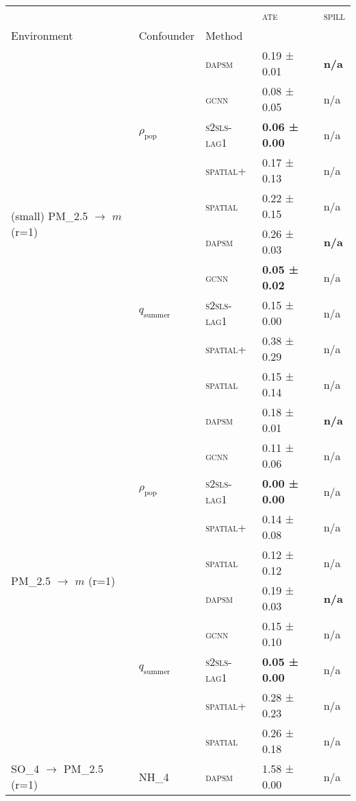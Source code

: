 \documentclass{article}
\begin{document}
\scriptsize
\begin{table}[!tbp]
\centering
\begin{tabular}{lllll}
\toprule
 &  &  & \textsc{ate} & \textsc{spill} \\
Environment & Confounder & Method &  &  \\
\midrule
\multirow[t]{10}{*}{(small) PM_{2.5} $\to$ $m$ (r=1)} & \multirow[t]{5}{*}{$\rho_{\text{pop}}$} & \textsc{dapsm} & 0.19 ± {\small 0.01} & \bf n/a \\
 &  & \textsc{gcnn} & 0.08 ± {\small 0.05} & n/a \\
 &  & \textsc{s2sls-lag1} & \bf 0.06 ± {\small 0.00} & n/a \\
 &  & \textsc{spatial+} & 0.17 ± {\small 0.13} & n/a \\
 &  & \textsc{spatial} & 0.22 ± {\small 0.15} & n/a \\
\cline{2-5}
 & \multirow[t]{5}{*}{$q_{\text{summer}}$} & \textsc{dapsm} & 0.26 ± {\small 0.03} & \bf n/a \\
 &  & \textsc{gcnn} & \bf 0.05 ± {\small 0.02} & n/a \\
 &  & \textsc{s2sls-lag1} & 0.15 ± {\small 0.00} & n/a \\
 &  & \textsc{spatial+} & 0.38 ± {\small 0.29} & n/a \\
 &  & \textsc{spatial} & 0.15 ± {\small 0.14} & n/a \\
\cline{1-5} \cline{2-5}
\multirow[t]{10}{*}{PM_{2.5} $\to$ $m$ (r=1)} & \multirow[t]{5}{*}{$\rho_{\text{pop}}$} & \textsc{dapsm} & 0.18 ± {\small 0.01} & \bf n/a \\
 &  & \textsc{gcnn} & 0.11 ± {\small 0.06} & n/a \\
 &  & \textsc{s2sls-lag1} & \bf 0.00 ± {\small 0.00} & n/a \\
 &  & \textsc{spatial+} & 0.14 ± {\small 0.08} & n/a \\
 &  & \textsc{spatial} & 0.12 ± {\small 0.12} & n/a \\
\cline{2-5}
 & \multirow[t]{5}{*}{$q_{\text{summer}}$} & \textsc{dapsm} & 0.19 ± {\small 0.03} & \bf n/a \\
 &  & \textsc{gcnn} & 0.15 ± {\small 0.10} & n/a \\
 &  & \textsc{s2sls-lag1} & \bf 0.05 ± {\small 0.00} & n/a \\
 &  & \textsc{spatial+} & 0.28 ± {\small 0.23} & n/a \\
 &  & \textsc{spatial} & 0.26 ± {\small 0.18} & n/a \\
\cline{1-5} \cline{2-5}
\multirow[t]{16}{*}{SO_{4} $\to$ PM_{2.5} (r=1)} & \multirow[t]{8}{*}{NH_4} & \textsc{dapsm} & 1.58 ± {\small 0.00} & n/a \\

\end{tabular}
\end{table}
\end{document}
